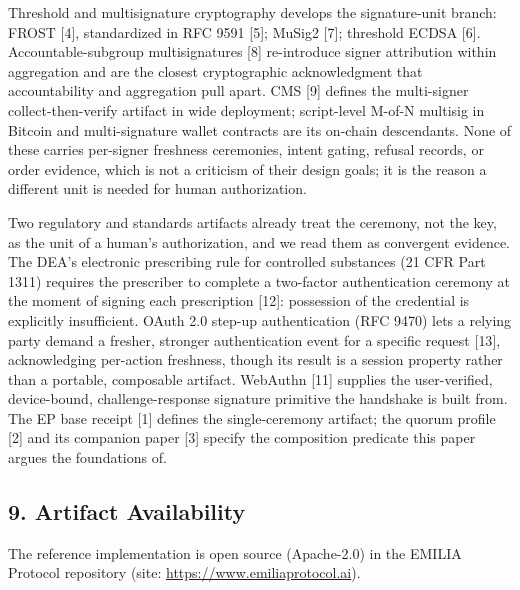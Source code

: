 \documentclass[
  11pt,
]{article}
\begin{document}
Threshold and multisignature cryptography develops the signature-unit
branch: FROST {[}4{]}, standardized in RFC 9591 {[}5{]}; MuSig2 {[}7{]};
threshold ECDSA {[}6{]}. Accountable-subgroup multisignatures {[}8{]}
re-introduce signer attribution within aggregation and are the closest
cryptographic acknowledgment that accountability and aggregation pull
apart. CMS {[}9{]} defines the multi-signer collect-then-verify artifact
in wide deployment; script-level M-of-N multisig in Bitcoin and
multi-signature wallet contracts are its on-chain descendants. None of
these carries per-signer freshness ceremonies, intent gating, refusal
records, or order evidence, which is not a criticism of their design
goals; it is the reason a different unit is needed for human
authorization.

Two regulatory and standards artifacts already treat the ceremony, not
the key, as the unit of a human's authorization, and we read them as
convergent evidence. The DEA's electronic prescribing rule for
controlled substances (21 CFR Part 1311) requires the prescriber to
complete a two-factor authentication ceremony at the moment of signing
each prescription {[}12{]}: possession of the credential is explicitly
insufficient. OAuth 2.0 step-up authentication (RFC 9470) lets a relying
party demand a fresher, stronger authentication event for a specific
request {[}13{]}, acknowledging per-action freshness, though its result
is a session property rather than a portable, composable artifact.
WebAuthn {[}11{]} supplies the user-verified, device-bound,
challenge-response signature primitive the handshake is built from. The
EP base receipt {[}1{]} defines the single-ceremony artifact; the quorum
profile {[}2{]} and its companion paper {[}3{]} specify the composition
predicate this paper argues the foundations of.

\subsection{9. Artifact Availability}\label{artifact-availability}

The reference implementation is open source (Apache-2.0) in the EMILIA
Protocol repository (site: \url{https://www.emiliaprotocol.ai}).
\end{document}
